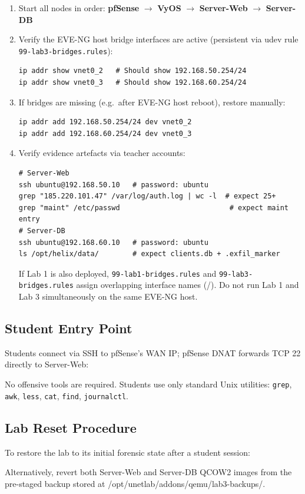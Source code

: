\begin{enumerate}
\def\labelenumi{\arabic{enumi}.}
\item
  Start all nodes in order: \textbf{pfSense} $\rightarrow$ \textbf{VyOS} $\rightarrow$ \textbf{Server-Web} $\rightarrow$ \textbf{Server-DB}
\item
  Verify the EVE-NG host bridge interfaces are active (persistent via udev rule \texttt{99-lab3-bridges.rules}):

\begin{lstlisting}
ip addr show vnet0_2   # Should show 192.168.50.254/24
ip addr show vnet0_3   # Should show 192.168.60.254/24
\end{lstlisting}
\item
  If bridges are missing (e.g.~after EVE-NG host reboot), restore manually:

\begin{lstlisting}
ip addr add 192.168.50.254/24 dev vnet0_2
ip addr add 192.168.60.254/24 dev vnet0_3
\end{lstlisting}
\item
  Verify evidence artefacts via teacher accounts:

\begin{lstlisting}
# Server-Web
ssh ubuntu@192.168.50.10   # password: ubuntu
grep "185.220.101.47" /var/log/auth.log | wc -l  # expect 25+
grep "maint" /etc/passwd                          # expect maint entry
# Server-DB
ssh ubuntu@192.168.60.10   # password: ubuntu
ls /opt/helix/data/        # expect clients.db + .exfil_marker
\end{lstlisting}

  If Lab 1 is also deployed, \texttt{99-lab1-bridges.rules} and \texttt{99-lab3-bridges.rules} assign overlapping interface names (/). Do not run Lab 1 and Lab 3 simultaneously on the same EVE-NG host.
\end{enumerate}

\subsection{Student Entry Point}

Students connect via SSH to pfSense's WAN IP; pfSense DNAT forwards TCP 22 directly to Server-Web:

No offensive tools are required. Students use only standard Unix utilities: \texttt{grep}, \texttt{awk}, \texttt{less}, \texttt{cat}, \texttt{find}, \texttt{journalctl}.

\subsection{Lab Reset Procedure}

To restore the lab to its initial forensic state after a student session:

Alternatively, revert both Server-Web and Server-DB QCOW2 images from the pre-staged backup stored at /opt/unetlab/addons/qemu/lab3-backups/.
